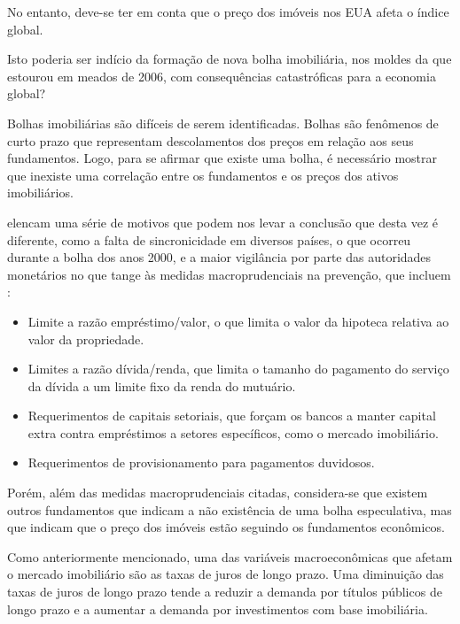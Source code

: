 \documentclass[
	12pt,				%
	oneside,			%
	a4paper,			%
	chapter=TITLE,		%
	section=TITLE,		%
	english,			%
	brazil				%
	]{abntex2}
\begin{document}
No entanto, deve-se ter em conta que o preço dos imóveis nos EUA afeta o
índice global.

Isto poderia ser indício da formação de nova bolha imobiliária, nos
moldes da que estourou em meados de 2006, com consequências
catastróficas para a economia global?

Bolhas imobiliárias são difíceis de serem identificadas. Bolhas são
fenômenos de curto prazo que representam descolamentos dos preços em
relação aos seus fundamentos. Logo, para se afirmar que existe uma
bolha, é necessário mostrar que inexiste uma correlação entre os
fundamentos e os preços dos ativos imobiliários.

\textcite{fmitwa} elencam uma série de motivos que podem nos levar a
conclusão que desta vez é diferente, como a falta de sincronicidade em
diversos países, o que ocorreu durante a bolha dos anos 2000, e a maior
vigilância por parte das autoridades monetários no que tange às medidas
macroprudenciais na prevenção, que incluem \autocite{fmiem}:
\begin{itemize}
\tightlist
\item
  Limite a razão empréstimo/valor, o que limita o valor da hipoteca
  relativa ao valor da propriedade.
\item
  Limites a razão dívida/renda, que limita o tamanho do pagamento do
  serviço da dívida a um limite fixo da renda do mutuário.
\item
  Requerimentos de capitais setoriais, que forçam os bancos a manter
  capital extra contra empréstimos a setores específicos, como o mercado
  imobiliário.
\item
  Requerimentos de provisionamento para pagamentos duvidosos.
\end{itemize}
Porém, além das medidas macroprudenciais citadas, considera-se que
existem outros fundamentos que indicam a não existência de uma bolha
especulativa, mas que indicam que o preço dos imóveis estão seguindo os
fundamentos econômicos.

Como anteriormente mencionado, uma das variáveis macroeconômicas que
afetam o mercado imobiliário são as taxas de juros de longo prazo. Uma
diminuição das taxas de juros de longo prazo tende a reduzir a demanda
por títulos públicos de longo prazo e a aumentar a demanda por
investimentos com base imobiliária.
\end{document}

